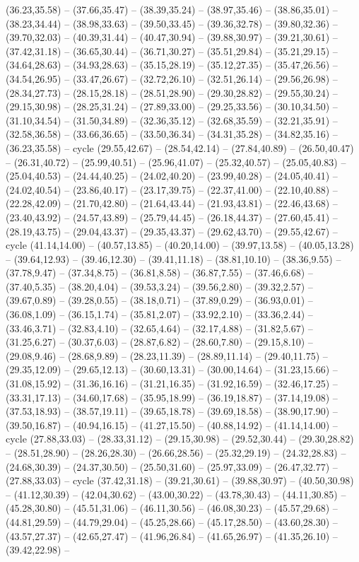 {(36.23,35.58) -- (37.66,35.47) -- (38.39,35.24) -- (38.97,35.46) -- (38.86,35.01) -- (38.23,34.44) -- (38.98,33.63) -- (39.50,33.45) -- (39.36,32.78) -- (39.80,32.36) -- (39.70,32.03) -- (40.39,31.44) -- (40.47,30.94) -- (39.88,30.97) -- (39.21,30.61) -- (37.42,31.18) -- (36.65,30.44) -- (36.71,30.27) -- (35.51,29.84) -- (35.21,29.15) -- (34.64,28.63) -- (34.93,28.63) -- (35.15,28.19) -- (35.12,27.35) -- (35.47,26.56) -- (34.54,26.95) -- (33.47,26.67) -- (32.72,26.10) -- (32.51,26.14) -- (29.56,26.98) -- (28.34,27.73) -- (28.15,28.18) -- (28.51,28.90) -- (29.30,28.82) -- (29.55,30.24) -- (29.15,30.98) -- (28.25,31.24) -- (27.89,33.00) -- (29.25,33.56) -- (30.10,34.50) -- (31.10,34.54) -- (31.50,34.89) -- (32.36,35.12) -- (32.68,35.59) -- (32.21,35.91) -- (32.58,36.58) -- (33.66,36.65) -- (33.50,36.34) -- (34.31,35.28) -- (34.82,35.16) -- (36.23,35.58) -- cycle (29.55,42.67) -- (28.54,42.14) -- (27.84,40.89) -- (26.50,40.47) -- (26.31,40.72) -- (25.99,40.51) -- (25.96,41.07) -- (25.32,40.57) -- (25.05,40.83) -- (25.04,40.53) -- (24.44,40.25) -- (24.02,40.20) -- (23.99,40.28) -- (24.05,40.41) -- (24.02,40.54) -- (23.86,40.17) -- (23.17,39.75) -- (22.37,41.00) -- (22.10,40.88) -- (22.28,42.09) -- (21.70,42.80) -- (21.64,43.44) -- (21.93,43.81) -- (22.46,43.68) -- (23.40,43.92) -- (24.57,43.89) -- (25.79,44.45) -- (26.18,44.37) -- (27.60,45.41) -- (28.19,43.75) -- (29.04,43.37) -- (29.35,43.37) -- (29.62,43.70) -- (29.55,42.67) -- cycle (41.14,14.00) -- (40.57,13.85) -- (40.20,14.00) -- (39.97,13.58) -- (40.05,13.28) -- (39.64,12.93) -- (39.46,12.30) -- (39.41,11.18) -- (38.81,10.10) -- (38.36,9.55) -- (37.78,9.47) -- (37.34,8.75) -- (36.81,8.58) -- (36.87,7.55) -- (37.46,6.68) -- (37.40,5.35) -- (38.20,4.04) -- (39.53,3.24) -- (39.56,2.80) -- (39.32,2.57) -- (39.67,0.89) -- (39.28,0.55) -- (38.18,0.71) -- (37.89,0.29) -- (36.93,0.01) -- (36.08,1.09) -- (36.15,1.74) -- (35.81,2.07) -- (33.92,2.10) -- (33.36,2.44) -- (33.46,3.71) -- (32.83,4.10) -- (32.65,4.64) -- (32.17,4.88) -- (31.82,5.67) -- (31.25,6.27) -- (30.37,6.03) -- (28.87,6.82) -- (28.60,7.80) -- (29.15,8.10) -- (29.08,9.46) -- (28.68,9.89) -- (28.23,11.39) -- (28.89,11.14) -- (29.40,11.75) -- (29.35,12.09) -- (29.65,12.13) -- (30.60,13.31) -- (30.00,14.64) -- (31.23,15.66) -- (31.08,15.92) -- (31.36,16.16) -- (31.21,16.35) -- (31.92,16.59) -- (32.46,17.25) -- (33.31,17.13) -- (34.60,17.68) -- (35.95,18.99) -- (36.19,18.87) -- (37.14,19.08) -- (37.53,18.93) -- (38.57,19.11) -- (39.65,18.78) -- (39.69,18.58) -- (38.90,17.90) -- (39.50,16.87) -- (40.94,16.15) -- (41.27,15.50) -- (40.88,14.92) -- (41.14,14.00) -- cycle (27.88,33.03) -- (28.33,31.12) -- (29.15,30.98) -- (29.52,30.44) -- (29.30,28.82) -- (28.51,28.90) -- (28.26,28.30) -- (26.66,28.56) -- (25.32,29.19) -- (24.32,28.83) -- (24.68,30.39) -- (24.37,30.50) -- (25.50,31.60) -- (25.97,33.09) -- (26.47,32.77) -- (27.88,33.03) -- cycle (37.42,31.18) -- (39.21,30.61) -- (39.88,30.97) -- (40.50,30.98) -- (41.12,30.39) -- (42.04,30.62) -- (43.00,30.22) -- (43.78,30.43) -- (44.11,30.85) -- (45.28,30.80) -- (45.51,31.06) -- (46.11,30.56) -- (46.08,30.23) -- (45.57,29.68) -- (44.81,29.59) -- (44.79,29.04) -- (45.25,28.66) -- (45.17,28.50) -- (43.60,28.30) -- (43.57,27.37) -- (42.65,27.47) -- (41.96,26.84) -- (41.65,26.97) -- (41.35,26.10) -- (39.42,22.98) -- }
